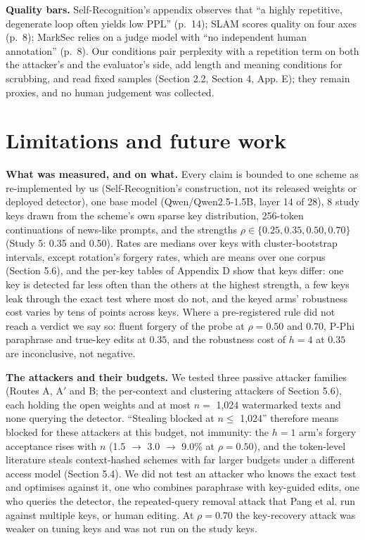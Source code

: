 \documentclass[11pt,letterpaper]{article}
\begin{document}
\textbf{Quality bars.} Self-Recognition's appendix observes that ``a highly repetitive, degenerate loop often yields low PPL'' (p.~14); SLAM scores quality on four axes (p.~8); MarkSec relies on a judge model with ``no independent human annotation'' (p.~8). Our conditions pair perplexity with a repetition term on both the attacker's and the evaluator's side, add length and meaning conditions for scrubbing, and read fixed samples (Section 2.2, Section 4, App. E); they remain proxies, and no human judgement was collected.

\hypertarget{limitations-and-future-work}{%
\section{Limitations and future work}\label{limitations-and-future-work}}

\textbf{What was measured, and on what.} Every claim is bounded to one scheme as re-implemented by us (Self-Recognition's construction, not its released weights or deployed detector), one base model (Qwen/Qwen2.5-1.5B, layer 14 of 28), 8 study keys drawn from the scheme's own sparse key distribution, 256-token continuations of news-like prompts, and the strengths \(\rho \in \{0.25, 0.35, 0.50, 0.70\}\) (Study 5: 0.35 and 0.50). Rates are medians over keys with cluster-bootstrap intervals, except rotation's forgery rates, which are means over one corpus (Section 5.6), and the per-key tables of Appendix D show that keys differ: one key is detected far less often than the others at the highest strength, a few keys leak through the exact test where most do not, and the keyed arms' robustness cost varies by tens of points across keys. Where a pre-registered rule did not reach a verdict we say so: fluent forgery of the probe at \(\rho = 0.50\) and \(0.70\), P-Phi paraphrase and true-key edits at \(0.35\), and the robustness cost of \(h = 4\) at \(0.35\) are inconclusive, not negative.

\textbf{The attackers and their budgets.} We tested three passive attacker families (Routes A, A\('\) and B; the per-context and clustering attackers of Section 5.6), each holding the open weights and at most \(n =\) 1,024 watermarked texts and none querying the detector. ``Stealing blocked at \(n \leq\) 1,024'' therefore means blocked for these attackers at this budget, not immunity: the \(h = 1\) arm's forgery acceptance rises with \(n\) (1.5 \ensuremath{\rightarrow} 3.0 \ensuremath{\rightarrow} 9.0\% at \(\rho = 0.50\)), and the token-level literature steals context-hashed schemes with far larger budgets under a different access model (Section 5.4). We did not test an attacker who knows the exact test and optimises against it, one who combines paraphrase with key-guided edits, one who queries the detector, the repeated-query removal attack that Pang et al. \citep{pang2024nofreelunch} run against multiple keys, or human editing. At \(\rho = 0.70\) the key-recovery attack was weaker on tuning keys and was not run on the study keys.
\end{document}
